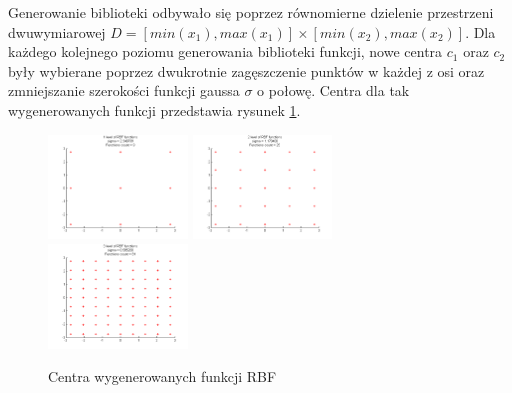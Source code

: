 Generowanie biblioteki odbywało się poprzez równomierne dzielenie przestrzeni dwuwymiarowej $D = [min(x_1),max(x_1)] \times [min(x_2),max(x_2)]$. Dla każdego kolejnego poziomu generowania biblioteki funkcji, nowe centra $c_1$ oraz $c_2$ były wybierane poprzez dwukrotnie zagęszczenie punktów w każdej z osi oraz zmniejszanie szerokości funkcji gaussa $\sigma$ o połowę. Centra dla tak wygenerowanych funkcji przedstawia rysunek \ref{img:rbf_centers}.

\begin{figure}[ht!]
	\centering	
	
	\subfloat
	{\includegraphics[width=0.33\textwidth]
	{images/centers1.png}}
	\subfloat
	{\includegraphics[width=0.33\textwidth]
	{images/centers2.png}}
	\subfloat
	{\includegraphics[width=0.33\textwidth]
	{images/centers3.png}}

	\caption{Centra wygenerowanych funkcji RBF}
	\label{img:rbf_centers}
\end{figure}

